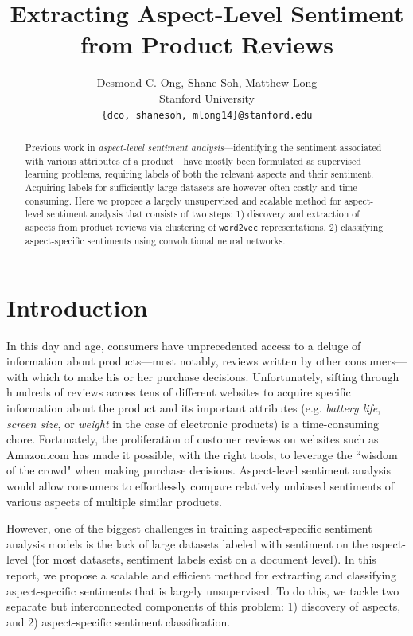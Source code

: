 \documentclass{article} %
\title{  Extracting Aspect-Level Sentiment from Product Reviews  }
\author{
Desmond C. Ong, Shane Soh, Matthew Long \\
Stanford University \\
\texttt{\{dco, shanesoh, mlong14\}@stanford.edu}
}
\begin{document}
\maketitle

\begin{abstract}
Previous work in \textit{aspect-level sentiment analysis}---identifying the sentiment associated with various attributes of a product---have mostly been formulated as supervised learning problems, requiring labels of both the relevant aspects and their sentiment. Acquiring labels for sufficiently large datasets are however often costly and time consuming. Here we propose a largely unsupervised and scalable method for aspect-level sentiment analysis that consists of two steps: 1) discovery and extraction of aspects from product reviews via clustering of \texttt{word2vec} representations, 2) classifying aspect-specific sentiments using convolutional neural networks.
\end{abstract}

\section{Introduction}


In this day and age, consumers have unprecedented access to a deluge of information about products---most notably, reviews written by other consumers---with which to make his or her purchase decisions. Unfortunately, sifting through hundreds of reviews across tens of different websites to acquire specific information about the product and its important attributes (e.g. \textit{battery life}, \textit{screen size}, or \textit{weight} in the case of electronic products) is a time-consuming chore. Fortunately, the proliferation of customer reviews on websites such as Amazon.com has made it possible, with the right tools, to leverage the ``wisdom of the crowd" when making purchase decisions. Aspect-level sentiment analysis would allow consumers to effortlessly compare relatively unbiased sentiments of various aspects of multiple similar products.

However, one of the biggest challenges in training aspect-specific sentiment analysis models is the lack of large datasets labeled with sentiment on the aspect-level (for most datasets, sentiment labels exist on a document level). In this report, we propose a scalable and efficient method for extracting and classifying aspect-specific sentiments that is largely unsupervised. To do this, we tackle two separate but interconnected components of this problem: 1) discovery of aspects, and 2) aspect-specific sentiment classification.
\end{document}

